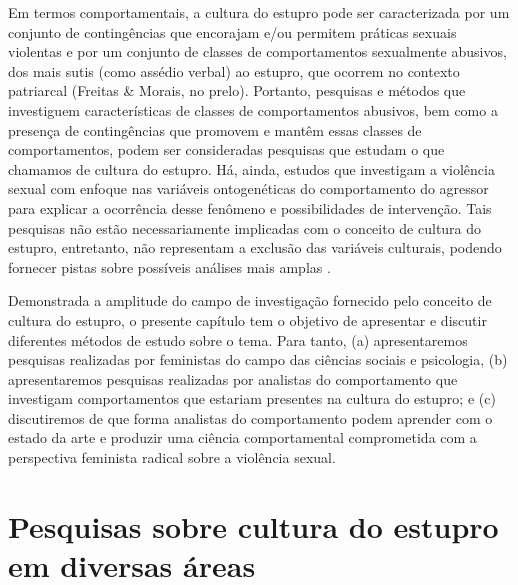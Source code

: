 Em termos comportamentais, a cultura do estupro pode ser caracterizada por um conjunto de contingências que encorajam e/ou permitem práticas sexuais violentas e por um conjunto de classes de comportamentos sexualmente abusivos, dos mais sutis (como assédio verbal) ao estupro, que ocorrem no contexto patriarcal (Freitas \& Morais, no prelo). Portanto, pesquisas e métodos que investiguem características de classes de comportamentos abusivos, bem como a presença de contingências que promovem e mantêm essas classes de comportamentos, podem ser consideradas pesquisas que estudam o que chamamos de cultura do estupro. Há, ainda, estudos que investigam a violência sexual com enfoque nas variáveis ontogenéticas do comportamento do agressor para explicar a ocorrência desse fenômeno e possibilidades de intervenção. Tais pesquisas não estão necessariamente implicadas com o conceito de cultura do estupro, entretanto, não representam a exclusão das 
variáveis culturais, podendo fornecer pistas sobre possíveis análises mais amplas
.

Demonstrada a amplitude do campo de investigação fornecido pelo conceito de cultura do estupro, o presente capítulo tem o objetivo de apresentar e discutir diferentes métodos de estudo sobre o tema. Para tanto, (a) apresentaremos pesquisas realizadas por feministas do campo das ciências sociais e psicologia, (b) apresentaremos pesquisas realizadas por analistas do comportamento que investigam comportamentos que estariam presentes na cultura do estupro; e (c) discutiremos de que forma analistas do comportamento podem aprender com o estado da arte e produzir uma ciência comportamental comprometida com a perspectiva feminista radical sobre a violência sexual.

\section{Pesquisas sobre cultura do estupro em diversas áreas}

